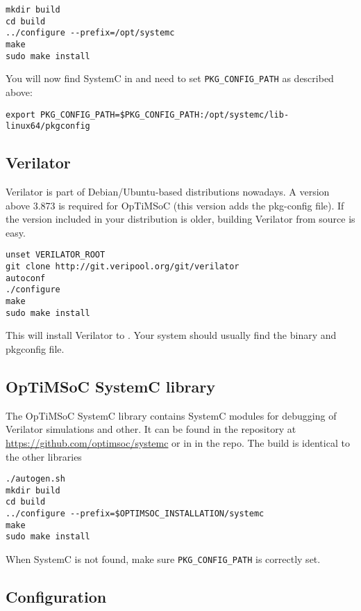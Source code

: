 \begin{lstlisting}
mkdir build
cd build
../configure --prefix=/opt/systemc
make
sudo make install
\end{lstlisting}

You will now find SystemC in  and need to set
\verb|PKG_CONFIG_PATH| as described above:

\begin{lstlisting}
export PKG_CONFIG_PATH=$PKG_CONFIG_PATH:/opt/systemc/lib-linux64/pkgconfig
\end{lstlisting}

\subsection{Verilator}

Verilator is part of Debian/Ubuntu-based distributions nowadays. A version
above 3.873 is required for OpTiMSoC (this version adds the pkg-config file).
If the version included in your distribution is older, building Verilator from
source is easy.

\begin{lstlisting}
unset VERILATOR_ROOT
git clone http://git.veripool.org/git/verilator
autoconf
./configure
make
sudo make install
\end{lstlisting}

This will install Verilator to . Your system should usually
find the binary and pkgconfig file.

\subsection{OpTiMSoC SystemC library}

The OpTiMSoC SystemC library contains SystemC modules for debugging of
Verilator simulations and other. It can be found in the repository at
\url{https://github.com/optimsoc/systemc} or in 
in the repo. The build is identical to the other libraries

\begin{lstlisting}
./autogen.sh
mkdir build
cd build
../configure --prefix=$OPTIMSOC_INSTALLATION/systemc
make
sudo make install
\end{lstlisting}

When SystemC is not found, make sure \verb|PKG_CONFIG_PATH| is
correctly set.

\subsection{Configuration}

